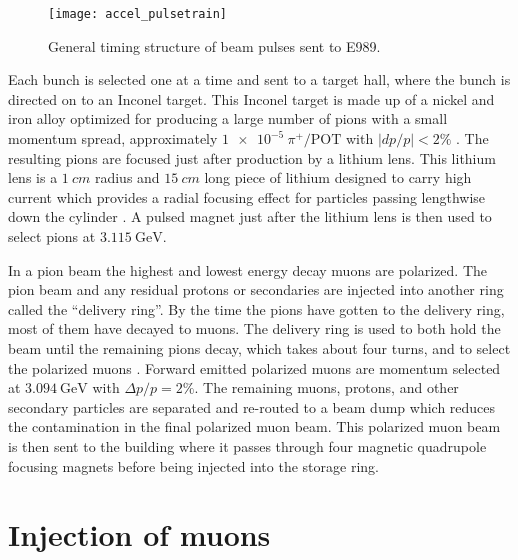 \begin{figure}[]
    \centering
    \texttt{[image: accel\_pulsetrain]}
    \caption[Fermilab accelerator pulse train]{General timing structure of beam pulses sent to E989.}   
    \label{fig:pulsetrain}
\end{figure}


Each bunch is selected one at a time and sent to a target hall, where the bunch is directed on to an Inconel target. This Inconel target is made up of a nickel and iron alloy optimized for producing a large number of pions with a small momentum spread, approximately $\SI{1e-5}{\pi^{+}/\text{POT}}$ with $|dp/p| < 2 \%$ \cite{Stratakis:2017uci}. The resulting pions are focused just after production by a lithium lens. This lithium lens is a $\SI{1}{cm}$ radius and $\SI{15}{cm}$ long piece of lithium designed to carry high current which provides a radial focusing effect for particles passing lengthwise down the cylinder \cite{LiLens}. A pulsed magnet just after the lithium lens is then used to select pions at $\SI{3.115}{\GeV}$.

In a pion beam the highest and lowest energy decay muons are polarized. The pion beam and any residual protons or secondaries are injected into another ring called the ``delivery ring''. By the time the pions have gotten to the delivery ring, most of them have decayed to muons. The delivery ring is used to both hold the beam until the remaining pions decay, which takes about four turns, and to select the polarized muons \cite{Stratakis:2017uci}. Forward emitted polarized muons are momentum selected at $\SI{3.094}{\GeV}$ with $\Delta p / p = 2\%$. The remaining muons, protons, and other secondary particles are separated and re-routed to a beam dump which reduces the contamination in the final polarized muon beam. This polarized muon beam is then sent to the \gmtwo building where it passes through four magnetic quadrupole focusing magnets before being injected into the storage ring.




\section{Injection of muons}
\label{sec:injection}


